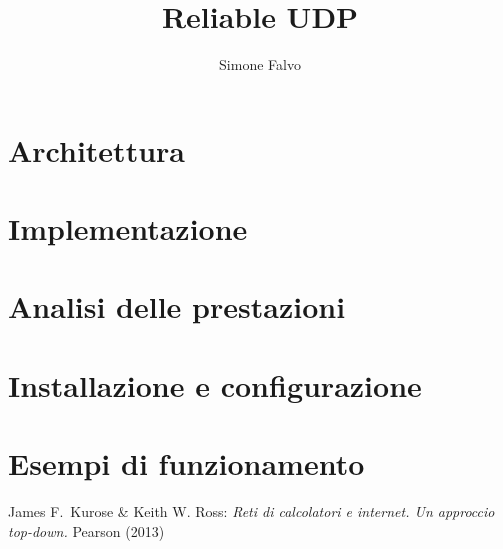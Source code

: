 \documentclass[a4paper,titlepage]{article}
\title{Reliable UDP}
\author{Simone Falvo}
\begin{document}
\maketitle



\tableofcontents
\newpage

\section{Architettura}




\section{Implementazione}







\section{Analisi delle prestazioni}



\section{Installazione e configurazione}


\section{Esempi di funzionamento}


\begin{thebibliography}{1}
 James F.~Kurose \& Keith W. Ross:
\emph{Reti di calcolatori e internet. Un approccio top-down.}
Pearson (2013)
\end{thebibliography}
\end{document}
